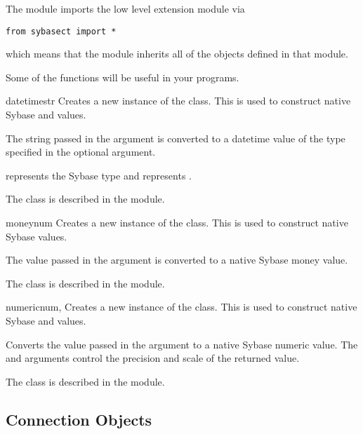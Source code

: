 The  module imports the low level 
extension module via

\begin{verbatim}
from sybasect import *
\end{verbatim}

which means that the  module inherits all of the
objects defined in that module.

Some of the functions will be useful in your programs.

\begin{funcdesc}{datetime}{str }
Creates a new instance of the  class.  This is used to
construct native Sybase  and  values.

The string passed in the  argument is converted to a datetime
value of the type specified in the optional  argument.

 represents the  Sybase
type and  represents
.

The  class is described in the 
module.
\end{funcdesc}

\begin{funcdesc}{money}{num}
Creates a new instance of the  class.  This is
used to construct native Sybase  values.

The value passed in the  argument is converted to a native
Sybase money value.

The  class is described in the 
module.
\end{funcdesc}

\begin{funcdesc}{numeric}{num, }
Creates a new instance of the  class.  This is used to
construct native Sybase  and  values.

Converts the value passed in the  argument to a native Sybase
numeric value.  The  and  arguments control
the precision and scale of the returned value.

The  class is described in the 
module.
\end{funcdesc}

\subsection{Connection Objects}

